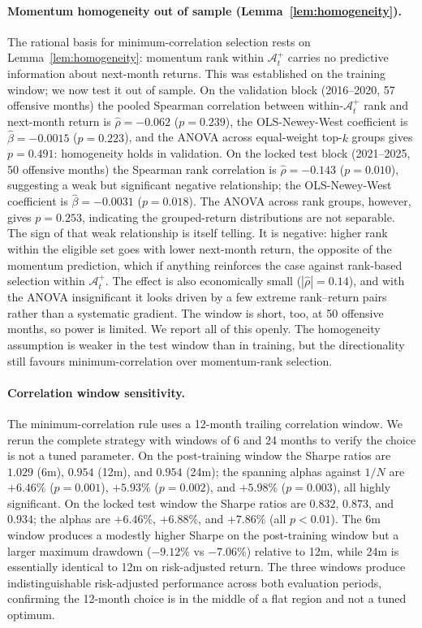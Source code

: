 \paragraph{Momentum homogeneity out of sample (Lemma~\ref{lem:homogeneity}).}
The rational basis for minimum-correlation selection rests on Lemma~\ref{lem:homogeneity}:
momentum rank within $\mathcal{A}_t^+$ carries no predictive information about
next-month returns. This was established on the training window; we now test it
out of sample. On the validation block (2016--2020, 57 offensive months) the pooled
Spearman correlation between within-$\mathcal{A}_t^+$ rank and next-month return is
$\hat{\rho} = -0.062$ ($p = 0.239$), the OLS-Newey-West coefficient is
$\hat{\beta} = -0.0015$ ($p = 0.223$), and the ANOVA across equal-weight
top-$k$ groups gives $p = 0.491$: homogeneity holds in validation.
On the locked test block (2021--2025, 50 offensive months) the Spearman rank
correlation is $\hat{\rho} = -0.143$ ($p = 0.010$), suggesting a weak but
significant negative relationship; the OLS-Newey-West coefficient is
$\hat{\beta} = -0.0031$ ($p = 0.018$). The ANOVA across rank groups, however,
gives $p = 0.253$, indicating the grouped-return distributions are not separable.
The sign of that weak relationship is itself telling. It is negative: higher
rank within the eligible set goes with lower next-month return, the opposite of the
momentum prediction, which if anything reinforces the case against rank-based
selection within $\mathcal{A}_t^+$. The effect is also economically small
($|\hat{\rho}| = 0.14$), and with the ANOVA insignificant it looks driven by a few
extreme rank--return pairs rather than a systematic gradient. The window is short,
too, at 50 offensive months, so power is limited. We report all of this openly. The
homogeneity assumption is weaker in the test window than in training, but the
directionality still favours minimum-correlation over momentum-rank selection.

\paragraph{Correlation window sensitivity.}
The minimum-correlation rule uses a 12-month trailing correlation window.
We rerun the complete strategy with windows of 6 and 24 months to verify the choice
is not a tuned parameter. On the post-training window the Sharpe ratios are
$1.029$ (6m), $0.954$ (12m), and $0.954$ (24m); the spanning alphas against $1/N$
are $+6.46\%$ ($p=0.001$), $+5.93\%$ ($p=0.002$), and $+5.98\%$ ($p=0.003$),
all highly significant. On the locked test window the Sharpe ratios are $0.832$,
$0.873$, and $0.934$; the alphas are $+6.46\%$, $+6.88\%$, and $+7.86\%$
(all $p < 0.01$). The 6m window produces a modestly higher Sharpe on the post-training
window but a larger maximum drawdown ($-9.12\%$ vs $-7.06\%$) relative to 12m, while
24m is essentially identical to 12m on risk-adjusted return. The three windows produce
indistinguishable risk-adjusted performance across both evaluation periods, confirming
the 12-month choice is in the middle of a flat region and not a tuned optimum.

